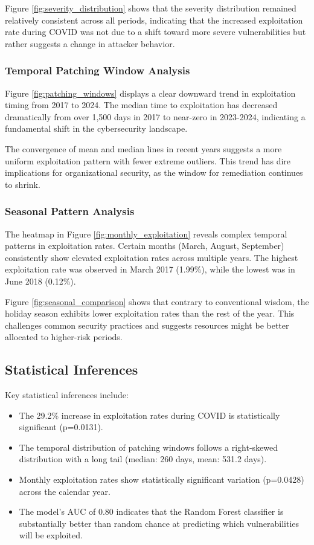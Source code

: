 \documentclass[runningheads]{llncs}
\begin{document}
Figure \ref{fig:severity_distribution} shows that the severity distribution remained relatively consistent across all periods, indicating that the increased exploitation rate during COVID was not due to a shift toward more severe vulnerabilities but rather suggests a change in attacker behavior.

\subsubsection{Temporal Patching Window Analysis}
Figure \ref{fig:patching_windows} displays a clear downward trend in exploitation timing from 2017 to 2024. The median time to exploitation has decreased dramatically from over 1,500 days in 2017 to near-zero in 2023-2024, indicating a fundamental shift in the cybersecurity landscape.

The convergence of mean and median lines in recent years suggests a more uniform exploitation pattern with fewer extreme outliers. This trend has dire implications for organizational security, as the window for remediation continues to shrink.

\subsubsection{Seasonal Pattern Analysis}
The heatmap in Figure \ref{fig:monthly_exploitation} reveals complex temporal patterns in exploitation rates. Certain months (March, August, September) consistently show elevated exploitation rates across multiple years. The highest exploitation rate was observed in March 2017 (1.99\%), while the lowest was in June 2018 (0.12\%).

Figure \ref{fig:seasonal_comparison} shows that contrary to conventional wisdom, the holiday season exhibits lower exploitation rates than the rest of the year. This challenges common security practices and suggests resources might be better allocated to higher-risk periods.

\subsection{Statistical Inferences}
Key statistical inferences include:

\begin{itemize}
    \item The 29.2\% increase in exploitation rates during COVID is statistically significant (p=0.0131).
    
    \item The temporal distribution of patching windows follows a right-skewed distribution with a long tail (median: 260 days, mean: 531.2 days).
    
    \item Monthly exploitation rates show statistically significant variation (p=0.0428) across the calendar year.
    
    \item The model's AUC of 0.80 indicates that the Random Forest classifier is substantially better than random chance at predicting which vulnerabilities will be exploited.
\end{itemize}
\end{document}
